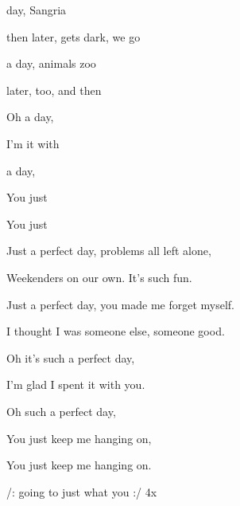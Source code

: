



      

\zs

  day,
 Sangria 

 then later,  gets dark,
we go 

 a  day,
 animals  zoo

 later,  too,
and then 

\bigskip

Oh  a  day,

I'm  it with 

 a  day,

You just   

You just   
\ks


\zs
Just a perfect day,
problems all left alone,

Weekenders on our own.
It's such fun.

Just a perfect day,
you made me forget myself.

I thought I was someone else,
someone good.

\bigskip

Oh it's such a perfect day,

I'm glad I spent it with you.

Oh such a perfect day,

You just keep me hanging on,

You just keep me hanging on.
\ks


/:
 going to  just what you   
:/ 4x


\kp


